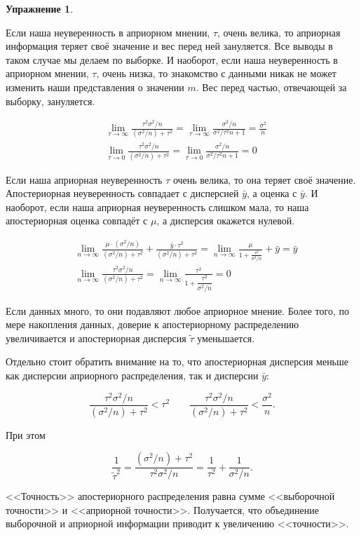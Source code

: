 \documentclass[12pt, a4paper, oneside]{extreport}
\theoremstyle{plain}              %
\theoremstyle{definition}         %
\newtheorem{problem}{\color{myblue} Упражнение}
\begin{document}
\begin{problem}
\begin{sol}
Если наша неуверенность в априорном мнении, $\tau$, очень велика, то априорная информация теряет своё значение и вес перед ней зануляется. Все выводы в таком случае мы делаем по выборке. И наоборот, если наша неуверенность в априорном мнении, $
\tau$, очень низка, то знакомство с данными никак не может изменить наши представления о значении $m$. Вес перед частью, отвечающей за выборку, зануляется.

\begin{align*}
&\lim_{\tau \to \infty} \frac{\tau^2 \sigma^2/n}{(\sigma^2/n) + \tau^2} = \lim_{\tau \to \infty} \frac{\sigma^2/n}{\sigma^2/\tau^2 n + 1} = \frac{\sigma^2}{n} \\
&\lim_{\tau \to 0} \frac{\tau^2 \sigma^2/n}{(\sigma^2/n) + \tau^2} = \lim_{\tau \to 0} \frac{\sigma^2/n}{\sigma^2/\tau^2 n + 1} = 0
\end{align*}

Если наша априорная неуверенность $\tau$ очень велика, то она теряет своё значение. Апостериорная неуверенность совпадает с дисперсией $\bar y$, а оценка с $\bar y$. И наоборот, если наша априорная неуверенность слишком мала, то наша апостериорная оценка совпадёт с $\mu$, а дисперсия окажется нулевой.

\begin{align*}
&\lim_{n \to \infty} \frac{\mu \cdot (\sigma^2/n)}{(\sigma^2/n) + \tau^2} + \frac{\bar y \cdot \tau^2}{(\sigma^2/n) + \tau^2} = \lim_{n \to \infty} \frac{\mu}{1 + \frac{\tau^2}{\sigma^2/n}} + \bar y = \bar y \\
&\lim_{n \to \infty} \frac{\tau^2 \sigma^2/n}{(\sigma^2/n) + \tau^2} = \lim_{n \to \infty} \frac{\tau^2}{1 + \dfrac{\tau^2}{\sigma^2/n}} = 0
\end{align*}

Если данных много, то они подавляют любое априорное мнение. Более того, по мере накопления данных, доверие к апостериорному распределению увеличивается и апостериорная дисперсия $\tilde \tau$  уменьшается. 

Отдельно стоит обратить внимание на то, что апостериорная дисперсия меньше как дисперсии априорного распределения, так и дисперсии $\bar y$: 

\[  \frac{\tau^2 \sigma^2/n}{(\sigma^2/n) + \tau^2} < \tau^2 \qquad \frac{\tau^2 \sigma^2/n}{(\sigma^2/n) + \tau^2} < \frac{\sigma^2}{n}. \] 

При этом 

\[ \frac{1}{\tilde{\tau}^2} = \frac{(\sigma^2/n) + \tau^2}{\tau^2 \sigma^2/n} = \frac{1}{\tau^2} + \frac{1}{\sigma^2/n}.\]

<<Точность>> апостериорного распределения равна сумме <<выборочной точности>> и <<априорной точности>>. Получается, что объединение выборочной и априорной информации приводит к увеличению <<точности>>. 
\end{sol}
\end{problem}
\end{document}
